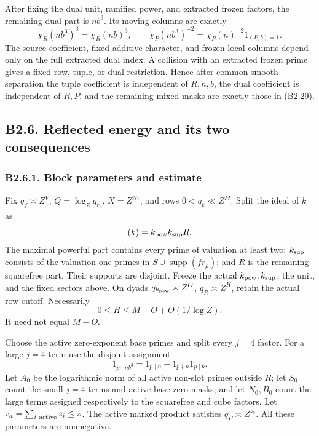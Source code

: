 \documentclass[11pt,a4paper]{article}
\begin{document}
After fixing the dual unit, ramified power, and extracted frozen
factors, the remaining dual part is \(nb^3\). Its moving columns are
exactly \[
\chi_R(nb^3)^3=\chi_R(nb)^3,\qquad
\chi_P(nb^3)^{-2}=\chi_P(n)^{-2}1_{(P,b)=1}.
\tag{B2.34}
\] The source coefficient, fixed additive character, and frozen local
columns depend only on the full extracted dual index. A collision with
an extracted frozen prime gives a fixed row, tuple, or dual restriction.
Hence after common smooth separation the tuple coefficient is
independent of \(R,\allowbreak{}n,\allowbreak{}b\), the dual coefficient is independent of
\(R,\allowbreak{}P\), and the remaining mixed masks are exactly those in (B2.29).

\hypertarget{b2.6.-reflected-energy-and-its-two-consequences}{%
\subsection{B2.6. Reflected energy and its two
consequences}\label{b2.6.-reflected-energy-and-its-two-consequences}}

\hypertarget{b2.6.1.-block-parameters-and-estimate}{%
\subsubsection{B2.6.1. Block parameters and
estimate}\label{b2.6.1.-block-parameters-and-estimate}}

Fix \(q_f\asymp Z^V\), \(Q=\log_Zq_{r_\rho}\), \(X=Z^{N_*}\), and rows
\(0<q_k\ll Z^M\). Split the ideal of \(k\) as \[
(k)=k_{\rm pow}k_{\rm sup}R.
\] The maximal powerful part contains every prime of valuation at least
two; \(k_{\rm sup}\) consists of the valuation-one primes in
\(S\cup\operatorname{supp}(fr_\rho)\); and \(R\) is the remaining
squarefree part. Their supports are disjoint. Freeze the actual
\(k_{\rm pow},\allowbreak{}k_{\rm sup}\), the unit, and the fixed sectors above. On
dyads \(q_{k_{\rm pow}}\asymp Z^O\), \(q_R\asymp Z^H\), retain the
actual row cutoff. Necessarily \[
0\le H\le M-O+O(1/\log Z).
\tag{B2.35}
\] It need not equal \(M-O\).

Choose the active zero-exponent base primes and split every \(j=4\)
factor. For a large \(j=4\) term use the disjoint assignment \[
1_{p\mid nb^3}=1_{p\mid n}+1_{p\nmid n}1_{p\mid b}.
\] Let \(A_0\) be the logarithmic norm of all active non-slot primes
outside \(R\); let \(S_0\) count the small \(j=4\) terms and active base
zero masks; and let \(N_0,\allowbreak{}B_0\) count the large terms assigned
respectively to the squarefree and cube factors. Let
\(z_a=\sum_{i\ {\rm active}}z_i\le z\). The active marked product
satisfies \(q_P\asymp Z^{z_a}\). All these parameters are nonnegative.
\end{document}
